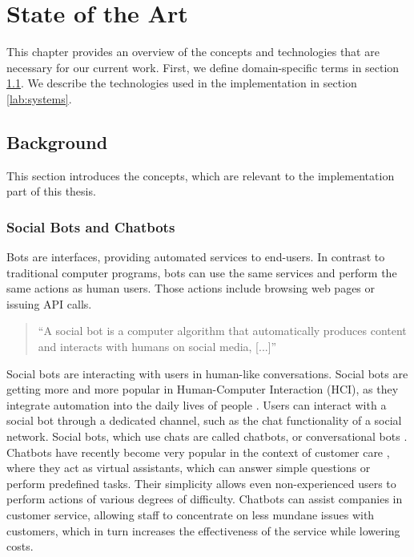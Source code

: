 \chapter{State of the Art}
This chapter provides an overview of the concepts and technologies that are necessary for our current work. First, we define domain-specific terms in section \ref{lab:background}. We describe the technologies used in the implementation in section \ref{lab:systems}.

\section{Background} \label{lab:background}

This section introduces the concepts, which are relevant to the implementation part of this thesis.

\subsection{Social Bots and Chatbots}\label{sec:chatbots}
Bots are interfaces, providing automated services to end-users.
In contrast to traditional computer programs, bots can use the same services and perform the same actions as human users. Those actions include browsing web pages or issuing API calls.
\begin{quote}
    ``A social bot is a computer algorithm that automatically produces content and interacts with humans on social media, [...]'' \cite{FVD*16b}
\end{quote}
Social bots are interacting with users in human-like conversations.
Social bots are getting more and more popular in Human-Computer Interaction (HCI), as they integrate automation into the daily lives of people \cite{BFPN17}. Users can interact with a social bot through a dedicated channel, such as the chat functionality of a social network.
Social bots, which use chats are called chatbots, or conversational bots \cite{WWX*16,AAA17}.
Chatbots have recently become very popular in the context of customer care \cite{CHW*17,FVD*16b}, where they act as virtual assistants, which can answer simple questions \cite{CaWh14} or perform predefined tasks. 
Their simplicity allows even non-experienced users to perform actions of various degrees of difficulty. 
Chatbots can assist companies in customer service, allowing staff to concentrate on less mundane issues with customers, which in turn increases the effectiveness of the service while lowering costs. \cite{AAA17}

